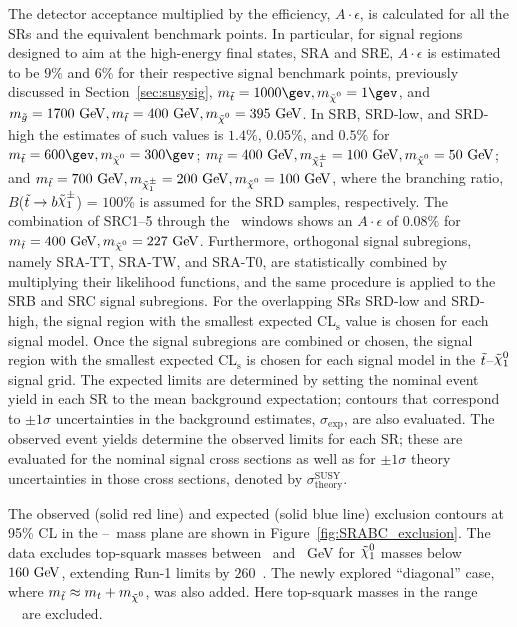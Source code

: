 			The detector acceptance multiplied by the efficiency, $A\cdot\epsilon$, is calculated for all the \acp{SR} and the equivalent benchmark points. In particular, for signal regions designed to aim at the high-energy final states, SRA and SRE, $A\cdot\epsilon$ is estimated to be $9\%$ and $6\%$ for their respective signal benchmark points, previously discussed in Section~\ref{sec:susysig}, $\mstop=1000\gev,\mLSP=1\gev$, and $m_{\gluino} = 1700\GeV, \mstop=400\GeV, \mLSP=395\GeV$. In SRB, SRD-low, and SRD-high the estimates of such values is $1.4\%$, $0.05\%$, and 0$.5\%$ for $\mstop=600\gev,\mLSP=300\gev$; $\mstop =400\GeV, m_{\chinoonepm}=100\GeV, \mLSP=50\GeV$; and $\mstop =700\GeV, m_{\chinoonepm}=200\GeV, \mLSP=100\GeV$, where the branching ratio, $B$($\stop\to b \chinoonepm$) = $100\%$ is assumed for the SRD samples, respectively. The combination of SRC1--5 through the \rISR\ windows shows an $A\cdot\epsilon$ of $0.08\%$ for $\mstop= 400\GeV, \mLSP=227\GeV$. Furthermore, orthogonal signal subregions, namely SRA-TT, SRA-TW, and SRA-T0, are statistically combined by multiplying their likelihood functions, and the same procedure is applied to the SRB and SRC signal subregions. For the overlapping \acp{SR} SRD-low and SRD-high, the signal region with the smallest expected CL$_\mathrm{s}$ value is chosen for each signal model. Once the signal subregions are combined or chosen, the signal region with the smallest expected CL$_\mathrm{s}$ is chosen for each signal model in the $\tilde{t}$--$\ninoone$ signal grid. The expected limits are determined by setting the nominal event yield in each \ac{SR} to the mean background expectation; contours that correspond to $\pm1\sigma$ uncertainties in the background estimates, $\sigma_{\mathrm{exp}}$, are also evaluated. The observed event yields determine the observed limits for each SR; these are evaluated for the nominal signal cross sections as well as for $\pm1\sigma$ theory uncertainties in those cross sections, denoted by $\sigma^{\mathrm{SUSY}}_{\mathrm{theory}}$. 

			The observed (solid red line) and expected (solid blue line) exclusion contours at 95\% CL in the \stop--\ninoone\ mass plane are shown in Figure~\ref{fig:SRABC_exclusion}. The data excludes top-squark masses between \stopLimLowLSPLow\ and \stopLimLowLSPHigh\ GeV for $\ninoone$ masses below $160\GeV$, extending Run-1 limits by $260$~\GeV. The newly explored ``diagonal'' case, where $\mstop\approx m_t+\mLSP$, was also added. Here top-squark masses in the range \stopLimDiag\ \GeV\ are excluded. 

